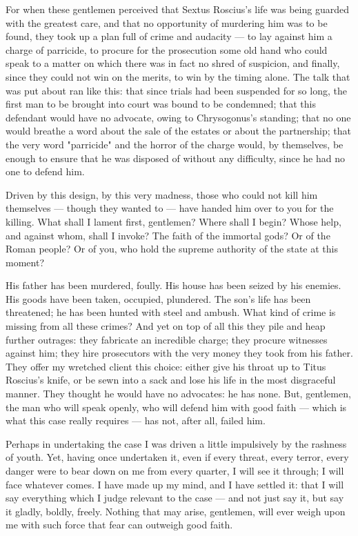  For when these gentlemen perceived that Sextus Roscius's life was being guarded with the greatest care, and that no opportunity of murdering him was to be found, they took up a plan full of crime and audacity --- to lay against him a charge of parricide, to procure for the prosecution some old hand who could speak to a matter on which there was in fact no shred of suspicion, and finally, since they could not win on the merits, to win by the timing alone. The talk that was put about ran like this: that since trials had been suspended for so long, the first man to be brought into court was bound to be condemned; that this defendant would have no advocate, owing to Chrysogonus's standing; that no one would breathe a word about the sale of the estates or about the partnership; that the very word "parricide" and the horror of the charge would, by themselves, be enough to ensure that he was disposed of without any difficulty, since he had no one to defend him.

 Driven by this design, by this very madness, those who could not kill him themselves --- though they wanted to --- have handed him over to you for the killing. What shall I lament first, gentlemen? Where shall I begin? Whose help, and against whom, shall I invoke? The faith of the immortal gods? Or of the Roman people? Or of you, who hold the supreme authority of the state at this moment?

 His father has been murdered, foully. His house has been seized by his enemies. His goods have been taken, occupied, plundered. The son's life has been threatened; he has been hunted with steel and ambush. What kind of crime is missing from all these crimes? And yet on top of all this they pile and heap further outrages: they fabricate an incredible charge; they procure witnesses against him; they hire prosecutors with the very money they took from his father. They offer my wretched client this choice: either give his throat up to Titus Roscius's knife, or be sewn into a sack and lose his life in the most disgraceful manner. They thought he would have no advocates: he has none. But, gentlemen, the man who will speak openly, who will defend him with good faith --- which is what this case really requires --- has not, after all, failed him.

 Perhaps in undertaking the case I was driven a little impulsively by the rashness of youth. Yet, having once undertaken it, even if every threat, every terror, every danger were to bear down on me from every quarter, I will see it through; I will face whatever comes. I have made up my mind, and I have settled it: that I will say everything which I judge relevant to the case --- and not just say it, but say it gladly, boldly, freely. Nothing that may arise, gentlemen, will ever weigh upon me with such force that fear can outweigh good faith.


